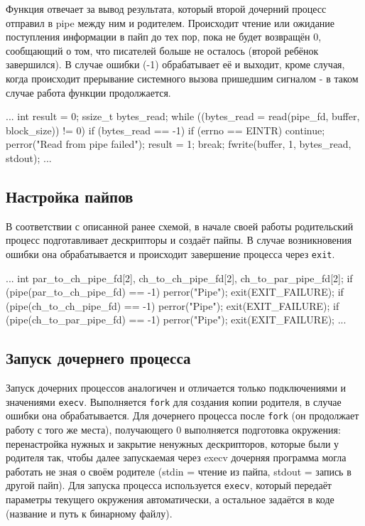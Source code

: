 \documentclass[a4paper,12pt]{article}
\begin{document}
Функция отвечает за вывод результата, который второй дочерний процесс отправил в pipe между ним и родителем. Происходит чтение или ожидание поступления информации в пайп до тех пор, пока не будет возвращён 0, сообщающий о том, что писателей больше не осталось (второй ребёнок завершился). В случае ошибки (-1) обрабатывает её и выходит, кроме случая, когда происходит прерывание системного вызова пришедшим сигналом - в таком случае работа функции продолжается.

\begin{codeblock}
...
int result = 0;
ssize_t bytes_read;
while ((bytes_read = read(pipe_fd, buffer, block_size)) != 0) {
    if (bytes_read == -1) {
        if (errno == EINTR) {
            continue;
        }
        perror("Read from pipe failed");
        result = 1;
        break;
    }
    fwrite(buffer, 1, bytes_read, stdout);
}
...
\end{codeblock}


\subsection{Настройка пайпов}

В соответствии с описанной ранее схемой, в начале своей работы родительский процесс подготавливает дескрипторы и создаёт пайпы. В случае возникновения ошибки она обрабатывается и происходит завершение процесса через \texttt{exit}.

\begin{codeblock}
...
int par_to_ch_pipe_fd[2], ch_to_ch_pipe_fd[2], ch_to_par_pipe_fd[2];
if (pipe(par_to_ch_pipe_fd) == -1) {
    perror("Pipe");
    exit(EXIT_FAILURE);
}
if (pipe(ch_to_ch_pipe_fd) == -1) {
    perror("Pipe");
    exit(EXIT_FAILURE);
}
if (pipe(ch_to_par_pipe_fd) == -1) {
    perror("Pipe");
    exit(EXIT_FAILURE);
}
...
\end{codeblock}


\subsection{Запуск дочернего процесса}

Запуск дочерних процессов аналогичен и отличается только подключениями и значениями \texttt{execv}. Выполняется \texttt{fork} для создания копии родителя, в случае ошибки она обрабатывается. Для дочернего процесса после \texttt{fork} (он продолжает работу с того же места), получающего 0 выполняется подготовка окружения: перенастройка нужных и закрытие ненужных дескрипторов, которые были у родителя так, чтобы далее запускаемая через execv дочерняя программа могла работать не зная о своём родителе (stdin = чтение из пайпа, stdout = запись в другой пайп). Для запуска процесса используется \texttt{execv}, который передаёт параметры текущего окружения автоматически, а остальное задаётся в коде (название и путь к бинарному файлу).
\end{document}
